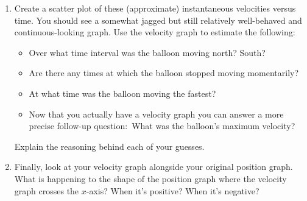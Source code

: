 \begin{enumerate}
	Apply this idea to compute an instantaneous velocity estimate for \textit{every} time in column~\textbf{D}. For example, the entry in the row for time~16 should compute an approximation for the instantaneous velocity at time~16, the entry in the row for time~763 should compute an approximation for the instantaneous velocity at time~763, and so on\footnote{Hint:~Most of the cells can be handled with a single formula copied into every row, but the first and last rows may need to be handled separately, since any average velocity computed for the first time cannot include data from an earlier time, and any average velocity computed for the last time cannot include data from a later time.}.
	
	\item Create a scatter plot of these (approximate) instantaneous velocities versus time. You should see a somewhat jagged but still relatively well-behaved and continuous-looking graph. Use the velocity graph to estimate the following:
	\begin{itemize}
		\item Over what time interval was the balloon moving north? South?
		\item Are there any times at which the balloon stopped moving momentarily?
		\item At what time was the balloon moving the fastest?
		\item Now that you actually have a velocity graph you can answer a more precise follow-up question:~What was the balloon's maximum velocity?
	\end{itemize}
	
	Explain the reasoning behind each of your guesses.
	
	\item Finally, look at your velocity graph alongside your original position graph. What is happening to the shape of the position graph where the velocity graph crosses the $x$-axis? When it's positive? When it's negative?
\end{enumerate}
